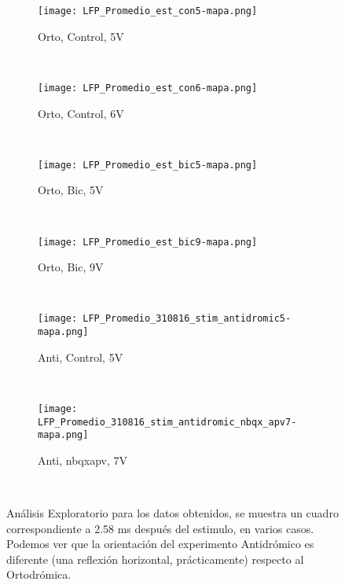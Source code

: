 \documentclass{article}
\begin{document}
\begin{figure}[h]
    \centering
    \begin{subfigure}[b]{0.45\textwidth}
        \texttt{[image: LFP\_Promedio\_est\_con5-mapa.png]}
        \caption{Orto, Control, 5V}
        \label{ocon5}
    \end{subfigure}
    ~ %
    \begin{subfigure}[b]{0.45\textwidth}
        \texttt{[image: LFP\_Promedio\_est\_con6-mapa.png]}
        \caption{Orto, Control, 6V}
        \label{ocon6}
    \end{subfigure} \\
 \begin{subfigure}[b]{0.45\textwidth}
        \texttt{[image: LFP\_Promedio\_est\_bic5-mapa.png]}
        \caption{Orto, Bic, 5V}
        \label{ocon5}
    \end{subfigure}
    ~ %
    \begin{subfigure}[b]{0.45\textwidth}
        \texttt{[image: LFP\_Promedio\_est\_bic9-mapa.png]}
        \caption{Orto, Bic,  9V}
        \label{ocon6}
    \end{subfigure} \\
 \begin{subfigure}[b]{0.45\textwidth}
        \texttt{[image: LFP\_Promedio\_310816\_stim\_antidromic5-mapa.png]}
        \caption{Anti, Control, 5V}
        \label{ocon5}
    \end{subfigure}
    ~ %
    \begin{subfigure}[b]{0.45\textwidth}
        \texttt{[image: LFP\_Promedio\_310816\_stim\_antidromic\_nbqx\_apv7-mapa.png]}
        \caption{Anti, nbqxapv, 7V}
        \label{ocon6}
    \end{subfigure} \\
    \caption{Análisis Exploratorio para los datos obtenidos,
      se muestra un cuadro correspondiente a 2.58 ms después del estimulo,
      en varios casos. Podemos ver que la orientación del experimento Antidrómico
      es diferente (una reflexión horizontal, prácticamente) respecto al Ortodrómica.
    }\label{exploratorio}
\end{figure}
\end{document}

